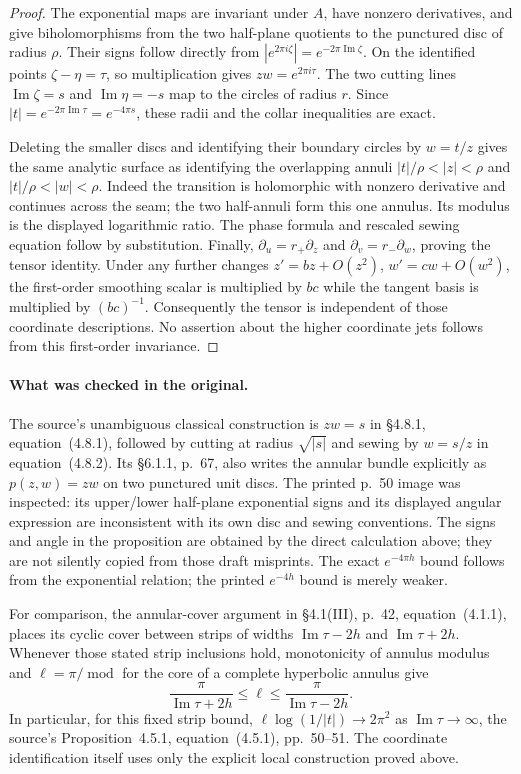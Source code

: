 \begin{proof}
The exponential maps are invariant under $A$, have nonzero derivatives,
and give biholomorphisms from the two half-plane quotients to the
punctured disc of radius $\rho$. Their signs follow directly from
$|e^{2\pi i\zeta}|=e^{-2\pi\operatorname{Im}\zeta}$.
On the identified points $\zeta-\eta=\tau$, so multiplication gives
$zw=e^{2\pi i\tau}$. The two cutting lines
$\operatorname{Im}\zeta=s$ and $\operatorname{Im}\eta=-s$ map to
the circles of radius $r$. Since $|t|=e^{-2\pi\operatorname{Im}\tau}
=e^{-4\pi s}$, these radii and the collar inequalities are exact.

Deleting the smaller discs and identifying their boundary circles by
$w=t/z$ gives the same analytic surface as identifying the overlapping
annuli $|t|/\rho<|z|<\rho$ and $|t|/\rho<|w|<\rho$.
Indeed the transition is holomorphic with nonzero derivative and
continues across the seam; the two half-annuli form this one annulus.
Its modulus is the displayed logarithmic ratio. The phase formula and
rescaled sewing equation follow by substitution. Finally,
$\partial_u=r_+\partial_z$ and
$\partial_v=r_-\partial_w$, proving the tensor identity.
Under any further changes $z'=bz+O(z^2)$, $w'=cw+O(w^2)$,
the first-order smoothing scalar is multiplied by $bc$ while the
tangent basis is multiplied by $(bc)^{-1}$. Consequently the tensor
is independent of those coordinate descriptions. No assertion about
the higher coordinate jets follows from this first-order invariance.
\end{proof}

\paragraph{What was checked in the original.}
The source's unambiguous classical construction is $zw=s$ in
\S4.8.1, equation~(4.8.1), followed by cutting at radius $\sqrt{|s|}$
and sewing by $w=s/z$ in equation~(4.8.2). Its \S6.1.1, p.~67,
also writes the annular bundle explicitly as
$p(z,w)=zw$ on two punctured unit discs.
The printed p.~50 image was inspected: its upper/lower half-plane
exponential signs and its displayed angular expression are inconsistent
with its own disc and sewing conventions. The signs and angle in the
proposition are obtained by the direct calculation above; they are
not silently copied from those draft misprints. The exact
$e^{-4\pi h}$ bound follows from the exponential relation; the printed
$e^{-4h}$ bound is merely weaker.

For comparison, the annular-cover argument in \S4.1(III), p.~42,
equation~(4.1.1), places its cyclic cover between strips of widths
$\operatorname{Im}\tau-2h$ and $\operatorname{Im}\tau+2h$.
Whenever those stated strip inclusions hold, monotonicity of annulus
modulus and $\ell=\pi/\operatorname{mod}$ for the core of a complete
hyperbolic annulus give
\[
 \frac{\pi}{\operatorname{Im}\tau+2h}
 \leq\ell\leq
 \frac{\pi}{\operatorname{Im}\tau-2h}.
\]
In particular, for this fixed strip bound,
$\ell\log(1/|t|)\longrightarrow2\pi^2$ as
$\operatorname{Im}\tau\longrightarrow\infty$, the source's
Proposition~4.5.1, equation~(4.5.1), pp.~50--51.
The coordinate identification itself uses only the explicit local
construction proved above.

